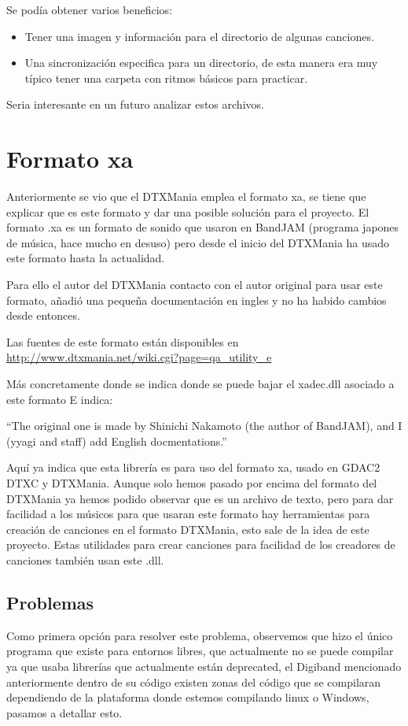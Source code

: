 \documentclass[a4paper,11pt,oneside]{book}
\begin{document}
Se podía obtener varios beneficios:

\begin{itemize}
\item Tener una imagen y información para el directorio de algunas canciones.
\item Una sincronización especifica para un directorio, de esta manera era muy típico tener una carpeta con ritmos básicos para practicar.
\end{itemize}

Seria interesante en un futuro analizar estos archivos.

\chapter{Formato xa}
Anteriormente se vio que el DTXMania emplea el formato xa, se tiene que explicar que es este formato y dar una posible solución para el proyecto.
El formato .xa es un formato de sonido que usaron en BandJAM (programa japones de música, hace mucho en desuso) pero desde el inicio del DTXMania ha usado este formato hasta la actualidad.

Para ello el autor del DTXMania contacto con el autor original para usar este formato, añadió una pequeña documentación en ingles y no ha habido cambios desde entonces.

Las fuentes de este formato están disponibles en \url{http://www.dtxmania.net/wiki.cgi?page=qa_utility_e}

Más concretamente donde se indica donde se puede bajar el xadec.dll asociado a este formato
E indica:

``The original one is made by Shinichi Nakamoto (the author of BandJAM), and I (yyagi and staff) add English docmentations.''

Aquí ya indica que esta librería es para uso del formato xa, usado en GDAC2 DTXC y DTXMania.
Aunque solo hemos pasado por encima del formato del DTXMania ya hemos podido observar que es un archivo de texto, pero para dar facilidad a los músicos para que usaran este formato hay herramientas para creación de canciones en el formato DTXMania, esto sale de la idea de este proyecto.
Estas utilidades para crear canciones para facilidad de los creadores de canciones también usan este .dll.

\section{Problemas}
Como primera opción para resolver este problema, observemos que hizo el único programa que existe para entornos libres, que actualmente no se puede compilar ya que usaba librerías que actualmente están deprecated, el Digiband mencionado anteriormente dentro de su código existen zonas del código que se compilaran dependiendo de la plataforma donde estemos compilando linux o Windows, pasamos a detallar esto.
\end{document}
